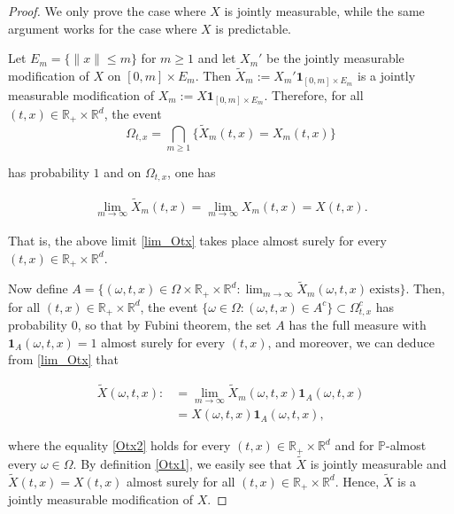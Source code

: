\documentclass[letterpaper, 11pt,  reqno]{amsart}
\newcommand{\noi}{\noindent}
\newcommand{\R}{\mathbb{R}}
\newcommand{\bP}{\mathbb{P}}
\newcommand{\wt}{\widetilde}
\renewcommand{\o}{\omega}
\renewcommand{\O}{\Omega}
\newcommand{\ind}{\mathbf 1}
\numberwithin{equation}{section}
\numberwithin{theorem}{section}
\begin{document}
\begin{proof}
We  only prove  the case where $X$ is jointly measurable, 
while  the same argument works  for the case where  $X$ is predictable.

Let $E_m = \{ \| x\| \leq m\}$ for $m\geq 1$
and   let $X_m'$ be the jointly measurable modification of $X$ on $[0,m]\times E_m$. 
Then $\wt{X}_m:=X_m' \ind_{[0,m]\times E_m}$ is a jointly measurable modification of 
$X_m:=X \ind_{[0,m]\times E_m}$. 
Therefore, for   all $(t,x)\in \R_+ \times \R^d$, the event 
\[
\O_{t,x} = \bigcap_{m\geq 1}\{\wt{X}_m(t,x) = X_m(t,x)  \}   \]

\noi
 has probability $1$
 and on $\O_{t,x}$, one has
 
 \noi
 \begin{align} \label{lim_Otx}
 \lim_{m\to \infty}\wt{X}_m(t,x) = \lim_{m\to \infty}X_m(t,x)=X(t,x).
\end{align}

\noi
That is, the above limit \eqref{lim_Otx} takes place almost surely
for every $(t,x)\in\R_+\times\R^d$.

Now define 
$A=\{(\o,t,x)\in \O \times \R_{+}\times \R^d: 
\lim_{m\to \infty} \wt{X}_m(\o,t,x) \, \mbox{exists}\}$.
 Then, for   all $(t,x)\in \R_{+}\times \R^d$, the event  
 $\{\o \in \O: (\o,t,x)\in A^c\} \subset \O^c_{t,x}$ has probability $0$,
 so that  by Fubini theorem, the set $A$ has the full measure
 with $\ind_A(\o,t,x) = 1$ almost surely for every $(t,x)$,
  and moreover,  we can deduce from \eqref{lim_Otx} that 
 
 \noi
 \begin{align}
 \wt{X}(\o, t, x) 
:&=\lim_{m\to \infty} \wt{X}_m(\o, t, x) \ind_A(\o, t, x) \label{Otx1} \\
&=  X(\o, t, x) \ind_A(\o, t, x),  \label{Otx2}
 \end{align}
 
 \noi
where  the equality \eqref{Otx2} holds for every $(t,x)\in\R_+\times\R^d$ 
and for  $\bP$-almost every $\o\in\O$.
By definition \eqref{Otx1}, we easily see that    
$\wt{X}$ is jointly measurable and $\wt{X}(t,x)=X(t,x)$ almost surely
for   all $(t,x) \in \R_{+}\times \R^d$. 
Hence, $\wt{X}$ is a jointly measurable
modification of $X$.
\qedhere


\end{proof}
\end{document}
